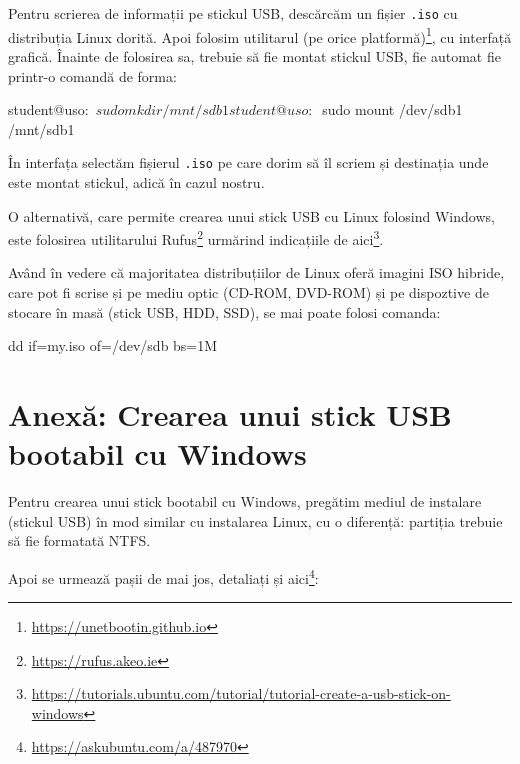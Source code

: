 Pentru scrierea de informații pe stickul USB, descărcăm un fișier \texttt{.iso} cu distribuția Linux dorită.
Apoi folosim utilitarul  (pe orice platformă)\footnote{\url{https://unetbootin.github.io}}, cu interfață grafică.
 Înainte de folosirea sa, trebuie să fie montat stickul USB, fie automat fie printr-o comandă de forma:

\begin{screen}
student@uso:~$ sudo mkdir /mnt/sdb1
student@uso:~$ sudo mount /dev/sdb1 /mnt/sdb1
\end{screen}

În interfața  selectăm fișierul \texttt{.iso} pe care dorim să îl scriem și destinația unde este montat stickul, adică  în cazul nostru.

O alternativă, care permite crearea unui stick USB cu Linux folosind Windows, este folosirea utilitarului Rufus\footnote{\url{https://rufus.akeo.ie}} urmărind indicațiile de aici\footnote{\url{https://tutorials.ubuntu.com/tutorial/tutorial-create-a-usb-stick-on-windows}}.

Având în vedere că majoritatea distribuțiilor de Linux oferă imagini ISO hibride, care pot fi scrise și pe mediu optic (CD-ROM, DVD-ROM) și pe dispoztive de stocare în masă (stick USB, HDD, SSD), se mai poate folosi comanda:

\begin{screen}
dd if=my.iso of=/dev/sdb bs=1M
\end{screen}

\section{Anexă: Crearea unui stick USB bootabil cu Windows}
\label{sec:boot:usb-windows}

Pentru crearea unui stick bootabil cu Windows, pregătim mediul de instalare (stickul USB) în mod similar cu instalarea Linux, cu o diferență: partiția trebuie să fie formatată NTFS.

Apoi se urmează pașii de mai jos, detaliați și aici\footnote{\url{https://askubuntu.com/a/487970}}:

